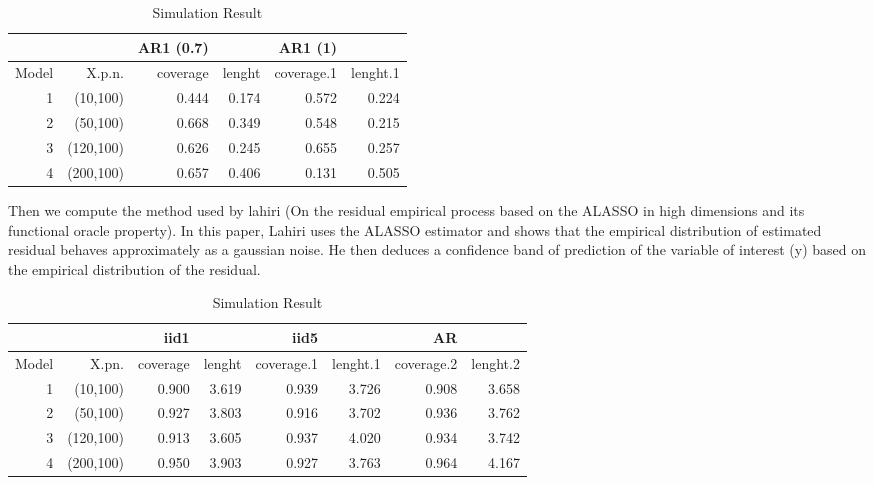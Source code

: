\documentclass[11pt,oneside, a4paper]{amsart}\usepackage[]{graphicx}\usepackage[]{color}
\makeatletter
\newenvironment{kframe}{%
 \def\at@end@of@kframe{}%
 \ifinner\ifhmode%
  \def\at@end@of@kframe{\end{minipage}}%
  \begin{minipage}{\columnwidth}%
 \fi\fi%
 \def\FrameCommand##1{\hskip\@totalleftmargin \hskip-\fboxsep
 \colorbox{shadecolor}{##1}\hskip-\fboxsep
     \hskip-\linewidth \hskip-\@totalleftmargin \hskip\columnwidth}%
 \MakeFramed {\advance\hsize-\width
   \@totalleftmargin\z@ \linewidth\hsize
   \@setminipage}}%
 {\par\unskip\endMakeFramed%
 \at@end@of@kframe}
\newenvironment{knitrout}{}{} %
\makeatother
\begin{document}
\begin{knitrout}
\color{fgcolor}\begin{kframe}


{\ttfamily\noindent\bfseries\color{errorcolor}{\#\# Error in ystar[, i] <- prediction + estar[, i]: l'argument de remplacement est de longueur nulle}}\end{kframe}
\end{knitrout}



\begin{table}[ht]
\centering
\caption{Simulation Result} 
\label{Test_table}
{\footnotesize
\begin{tabular}{|r|r|rr|rr|}
  \toprule 
    &  & AR1 (0.7) &  & AR1 (1) &  \\
 \midrule 
Model & X.p.n. & coverage & lenght & coverage.1 & lenght.1 \\ 
    1 & (10,100) & 0.444 & 0.174 & 0.572 & 0.224 \\ 
     2 & (50,100) & 0.668 & 0.349 & 0.548 & 0.215 \\ 
     3 & (120,100) & 0.626 & 0.245 & 0.655 & 0.257 \\ 
     4 & (200,100) & 0.657 & 0.406 & 0.131 & 0.505 \\ 
   \bottomrule 
\end{tabular}
}
\end{table}








Then we compute the method used by lahiri (On the residual empirical process based on the ALASSO in high dimensions and its functional oracle property). In this paper, Lahiri uses the ALASSO estimator and shows that the empirical distribution of estimated residual behaves approximately as a gaussian noise. He then deduces a confidence band of prediction of the variable of interest (y) based on the empirical distribution of the residual.




\begin{table}[ht]
\centering
\caption{Simulation Result} 
\label{Test_table}
{\footnotesize
\begin{tabular}{|r|r|rr|rr|rr|}
  \toprule 
    &  & iid1 &  & iid5 & & AR & \\
 \midrule 
Model & X.pn. & coverage & lenght & coverage.1 & lenght.1 & coverage.2 & lenght.2 \\ 
    1 & (10,100) & 0.900 & 3.619 & 0.939 & 3.726 & 0.908 & 3.658 \\ 
     2 & (50,100) & 0.927 & 3.803 & 0.916 & 3.702 & 0.936 & 3.762 \\ 
     3 & (120,100) & 0.913 & 3.605 & 0.937 & 4.020 & 0.934 & 3.742 \\ 
     4 & (200,100) & 0.950 & 3.903 & 0.927 & 3.763 & 0.964 & 4.167 \\ 
   \bottomrule 
\end{tabular}
}
\end{table}
\end{document}
